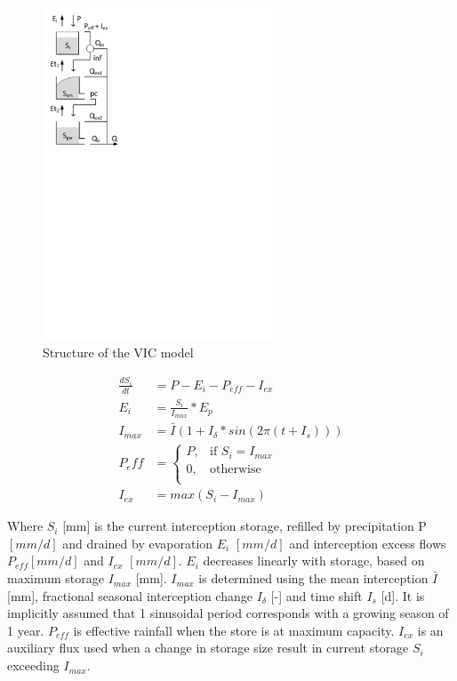 { 																	%
\begin{figure}
\includegraphics[trim=1cm 17cm 7cm 1cm,width=7cm,keepaspectratio]{./files/22_schematic.pdf}
\caption{Structure of the VIC model} \label{fig:22_schematic}
\end{figure}

\begin{align}
	\frac{dS_i}{dt} &= P - E_i - P_{eff} - I_{ex} \\
	E_i &= \frac{S_i}{I_{max}}*E_p \\
	I_{max} &= \bar{I}\left(1+I_{\delta}*sin\left(2\pi(t+I_s)\right)\right)\\
	P_eff &=\begin{cases}
		P, & \text{if }S_i = I_{max} \\
		0, & \text{otherwise}\\
	\end{cases}\\
	I_{ex} &= max\left(S_i - I_{max}\right)
\end{align}

Where $S_i$ [mm] is the current interception storage, refilled by precipitation P $[mm/d]$ and drained by evaporation $E_i$ $[mm/d]$ and interception excess flows $P_{eff}$$[mm/d]$ and $I_{ex}$ $[mm/d]$. $E_i$ decreases linearly with storage, based on maximum storage $I_{max}$ [mm]. $I_{max}$ is determined using the mean interception $\bar{I}$ [mm], fractional seasonal interception change $I_{\delta}$ [-] and time shift $I_s$ [d]. It is implicitly assumed that 1 sinusoidal period corresponds with a growing season of 1 year. $P_{eff}$ is effective rainfall when the store is at maximum capacity. $I_{ex}$ is an auxiliary flux used when a change in storage size result in current storage $S_i$ exceeding $I_{max}$.

} %

